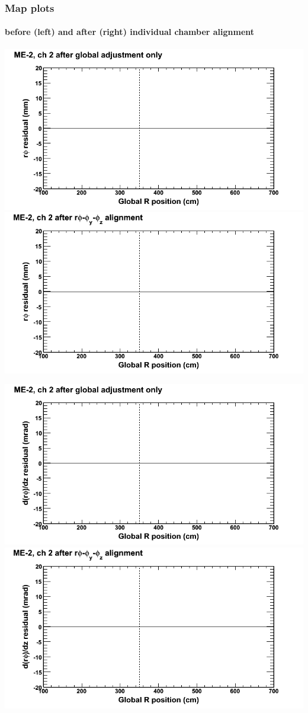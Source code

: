 \documentclass[compress]{beamer}
\begin{document}
\begin{frame}
\frametitle{Map plots}
\framesubtitle{before (left) and after (right) individual chamber alignment}
\includegraphics[width=0.5\linewidth]{ringmapplots_3dof/before_CSCvsr_mem2ch02_x.png} \includegraphics[width=0.5\linewidth]{ringmapplots_3dof/after_CSCvsr_mem2ch02_x.png}

\includegraphics[width=0.5\linewidth]{ringmapplots_3dof/before_CSCvsr_mem2ch02_dxdz.png} \includegraphics[width=0.5\linewidth]{ringmapplots_3dof/after_CSCvsr_mem2ch02_dxdz.png}
\end{frame}
\end{document}
